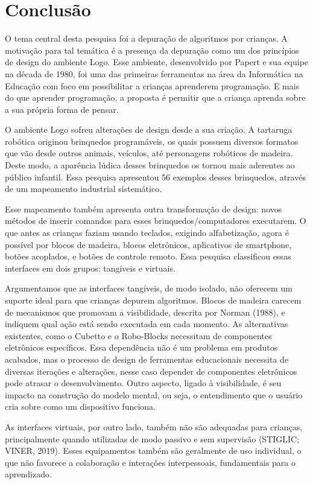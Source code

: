 \chapter{Conclusão}
\label{c_conclusao}

O tema central desta pesquisa foi a depuração de algoritmos por crianças. A motivação para tal temática é a presença da depuração como um dos princípios de design do ambiente Logo. Esse ambiente, desenvolvido por Papert e sua equipe na década de 1980, foi uma das primeiras ferramentas na área da Informática na Educação com foco em possibilitar a crianças aprenderem programação. E mais do que aprender programação, a proposta é permitir que a criança aprenda sobre a sua própria forma de pensar. 

O ambiente Logo sofreu alterações de design desde a sua criação. A tartaruga robótica originou brinquedos programáveis, os quais possuem diversos formatos que vão desde outros animais, veículos, até personagens robóticos de madeira. Deste modo, a aparência lúdica desses brinquedos os tornou mais aderentes ao público infantil. Essa pesquisa apresentou 56 exemplos desses brinquedos, através de um mapeamento industrial sistemático. 

Esse mapeamento também apresenta outra transformação de design: novos métodos de inserir comandos para esses brinquedos/computadores executarem. O que antes as crianças faziam usando teclados, exigindo alfabetização, agora é possível por blocos de madeira, blocos eletrônicos, aplicativos de smartphone, botões acoplados, e botões de controle remoto. Essa pesquisa classificou essas interfaces em dois grupos: tangíveis e virtuais.

Argumentamos que as interfaces tangíveis, de modo isolado, não oferecem um suporte ideal para que crianças depurem algoritmos. Blocos de madeira carecem de mecanismos que promovam a visibilidade, descrita por Norman (1988), e indiquem qual ação está sendo executada em cada momento. As alternativas existentes, como o Cubetto e o Robo-Blocks necessitam de componentes eletrônicos específicos. Essa dependência não é um problema em produtos acabados, mas o processo de design de ferramentas educacionais necessita de diversas iterações e alterações, nesse caso depender de componentes eletrônicos pode atrasar o desenvolvimento. Outro aspecto, ligado à visibilidade, é seu impacto na construção do modelo mental, ou seja, o entendimento que o usuário cria sobre como um dispositivo funciona. 

As interfaces virtuais, por outro lado, também não são adequadas para crianças, principalmente quando utilizadas de modo passivo e sem supervisão (STIGLIC; VINER, 2019). Esses equipamentos também são geralmente de uso individual, o que não favorece a colaboração e interações interpessoais, fundamentais para o aprendizado.

